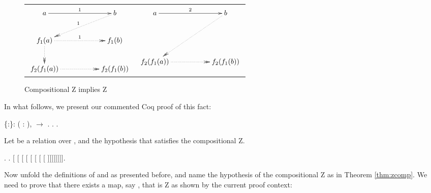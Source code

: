     \begin{figure}[h]\begin{tabular}{l@{\hskip 3cm}l} $\xymatrix{ a
    \ar@{->}[rr]^1 && b \ar@{.>>}[dll]_1\\ f_1(a)\ar@{.>>}[d]
    \ar@{.>>}[rr]^1 && f_1(b) \\ f_2(f_1(a)) \ar@{.>>}[rr] &&
    f_2(f_1(b)) }$ & $\xymatrix{ a \ar@{->}[rr]^2 && b
    \ar@{.>>}[ddll]\\ & & \\ f_2(f_1(a)) \ar@{.>>}[rr] && f_2(f_1(b))
    }$ \end{tabular}\caption{Compositional Z implies
    Z}\label{fig:zcomp}\end{figure}


    In what follows, we present our commented Coq proof of this fact:
    \begin{coqdoccode}
\coqdocemptyline
\coqdocnoindent
{}  \{:\}: \coqdockw{\ensuremath{\forall}} ( : ),   \ensuremath{\rightarrow}  .\coqdoceol
\coqdocnoindent
{}.\coqdoceol
\coqdocindent{1.00em}
  . \end{coqdoccode}
Let  be a relation over , and  the
      hypothesis that  satisfies the compositional Z. \begin{coqdoccode}
\coqdocemptyline
\coqdocindent{1.00em}
 .    .    [  [  [ [ [ [ [ [ ]]]]]]]]. \end{coqdoccode}
      Now unfold the definitions of  and  as presented
      before, and name the hypothesis of the compositional Z as in
      Theorem \ref{thm:zcomp}. We need to prove that there exists a
      map, say , that is Z as shown by the current proof context:
      \newline


